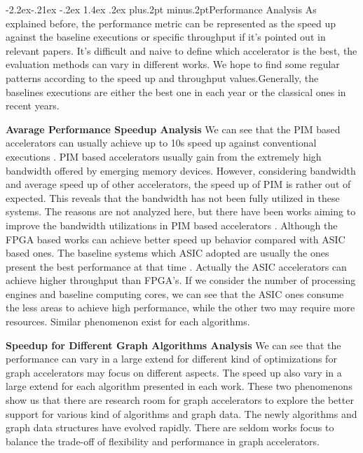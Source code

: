 \documentclass[twoside]{article}
\makeatletter
\def\subsubsection{\@startsection{subsubsection}{3}{\z@}%
 {-2.2ex\@plus -.21ex \@minus -.2ex}%
 {1.4ex \@plus.2ex}
{\normalfont\normalsize\protect\baselineskip=12pt plus.2pt minus.2pt\sl}}
\makeatother
\begin{document}
\begin{multicols}{2}
\subsubsection{Performance Analysis}
As explained before, the performance metric can be represented as the speed up against the baseline executions or specific throughput if it's pointed out in relevant papers. It's difficult and naive to define which accelerator is the best, the evaluation methods can vary in different works. We hope to find some regular patterns according to the speed up and throughput values.Generally, the baselines executions are either the best one in each year or the classical ones in recent years.  

{\bf Avarage Performance Speedup Analysis} We can see that the PIM based accelerators can usually achieve up to 10s speed up against conventional executions \cite{ahn2015tesseract,zhang2018graphp, song2018graphr}. PIM based accelerators usually gain from the extremely high bandwidth offered by emerging memory devices. However, considering bandwidth and average speed up of other accelerators, the speed up of PIM is rather out of expected. This reveals that the bandwidth has not been fully utilized in these systems. The reasons are not analyzed here, but there have been works aiming to improve the bandwidth utilizations in PIM based accelerators \cite{zhang2018graphp,dai2018graphh}. Although the FPGA based works can achieve better speed up behavior compared with ASIC based ones. The baseline systems which ASIC adopted are usually the ones present the best performance at that time \cite{ham2016graphicionado,sundaram2015graphmat,ozdal2016energy}. Actually the ASIC accelerators can achieve higher throughput than FPGA's. If we consider the number of processing engines and baseline computing cores, we can see that the ASIC ones consume the less areas to achieve high performance, while the other two may require more resources. Similar phenomenon exist for each algorithms. 

{\bf Speedup for Different Graph Algorithms Analysis} We can see that the performance can vary in a large extend for different kind of optimizations for graph accelerators may focus on different aspects. The speed up also vary in a large extend for each algorithm presented in each work. These two phenomenons show us that there are research room for graph accelerators to explore the better support for various kind of algorithms and graph data. The newly algorithms and graph data structures have evolved rapidly. There are seldom works focus to balance the trade-off of flexibility and performance in graph accelerators. 


\end{multicols}
\end{document}
